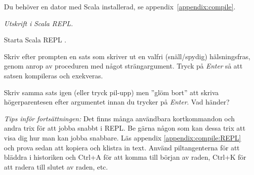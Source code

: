
\ifPreSolution
\Exercise{\ExeWeekONE}\label{exe:W01}

\begin{Goals}

\end{Goals}

\begin{Preparations}
\item {}
\item Du behöver en dator med Scala installerad, se appendix~\ref{appendix:compile}.
\end{Preparations}

\fi  %



\BasicTasks



\def\what{\emph{Utskrift i Scala REPL.}}

\QUESTBEGIN

\Task \what 

\vspace{1em}\noindent Starta Scala REPL .


\Subtask Skriv efter prompten  en sats som skriver ut en valfri (snäll/spydig) hälsningsfras, genom anrop av proceduren  med något strängargument. Tryck på \textit{Enter} så att satsen kompileras och exekveras. 

\Subtask Skriv samma sats igen (eller tryck pil-upp) men ''glöm bort'' att skriva högerparentesen efter argumentet innan du trycker på \textit{Enter}. Vad händer?

\begin{framed}
\noindent\emph{Tips inför fortsättningen:} Det finns många användbara kortkommandon och andra trix för att jobba snabbt i REPL. Be gärna någon som kan dessa trix att visa dig hur man kan jobba snabbare. Läs appendix \ref{appendix:compile:REPL} och prova sedan att kopiera och klistra in text. Använd piltangenterna för att bläddra i historiken och Ctrl+A för att komma till början av raden, Ctrl+K för att radera till slutet av raden, etc.
\end{framed}

